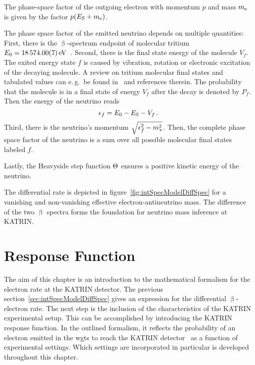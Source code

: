 The phase-space factor of the outgoing electron with momentum $p$ and mass $m_{\mathrm{e}}$ is given by the factor $p(E_\mathrm{S}+m_{\mathrm{e}})$.

The phase space factor of the emitted neutrino  depends on multiple quantities: First, there is the $\upbeta$-spectrum endpoint of molecular tritium $E_0=\SI{18574.00\pm0.07}{eV}$~\cite{Myers2015,Otten:2008zz}. Second, there is the final state energy of the molecule $V_f$. The exited energy state $f$ is caused by vibration, rotation or electronic excitation of the decaying molecule. A review on tritium molecular final states and tabulated values can e.\,g.~be found in~\cite{Bodine2015} and references therein. The probability that the molecule is in a final state of energy $V_f$ after the decay is denoted by $P_f$. Then the energy of the neutrino reads 
\begin{equation}
\label{eq:intSpecModelDiffSpecNeutrinoEnergy}
\epsilon_f = E_0 - E_\mathrm{S} - V_f 
\text{\,.}
\end{equation}
Third, there is the neutrino's momentum $\sqrt{\epsilon_f^2-m_\upnu^2}$. Then, the complete phase space factor of the neutrino is a sum over all possible molecular final states labeled $f$.

Lastly, the Heavyside step function $\Theta$ ensures a positive kinetic energy of the neutrino.

The differential rate is depicted in figure~\ref{fig:intSpecModelDiffSpec} for a vanishing and non-vanishing effective electron-antineutrino mass. The difference of the two $\upbeta$ spectra forms the foundation for neutrino mass inference at KATRIN.

\section{Response Function}
\label{sec:intSpecModelResponse}
The aim of this chapter is an introduction to the mathematical formalism for the electron rate at the KATRIN detector. The previous section~\ref{sec:intSpecModelDiffSpec} gives an expression for the differential $\upbeta$-electron rate. The next step is the inclusion of the characteristics of the KATRIN experimental setup. This can be accomplished by introducing the KATRIN response function. In the outlined formalism, it reflects the probability of an electron emitted in the \gls{wgts} to reach the KATRIN detector~\cite{Groh2015} as a function of experimental settings. Which settings are incorporated in particular is developed throughout this chapter.

